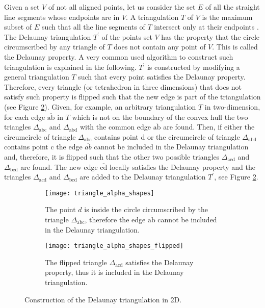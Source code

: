 Given a set $V$ of not all aligned points, let us consider the set $E$ of all the straight line segments whose endpoints are in $V$. 
A triangulation $T$ of $V$ is the maximum subset of $E$ such that all the line segments of $T$ intersect only at their endpoints \cite{lloyd1977triangulations}. \\ \indent 
The Delaunay triangulation $T^{\prime}$ of the points set $V$ has the property that the circle circumscribed by any triangle of $T$ does not contain any point of $V$. This is called the Delaunay property. A very common used algorithm to construct such triangulation is explained in the following. 
$T^\prime$ is constructed by modifying a general triangulation $T$ such that every point satisfies the Delaunay property. 
Therefore, every triangle (or tetrahedron in three dimensions) that does not satisfy such property is flipped such that the new edge is part of the triangulation (see Figure \ref{fig:Delaunay}). 
Given, for example, an arbitrary triangulation $T$ in two-dimension, for each edge $\overline{\textrm{ab}}$ in $T$ which is not on the boundary of the convex hull the two triangles 
$\Delta_{\textrm{abc}}$ and $\Delta_{\textrm{abd}}$ with the common edge $\overline{\textrm{ab}}$ are found. Then, if either the circumcircle of triangle $\Delta_{\textrm{abc}}$ contains point \textrm{d} or the circumcircle of triangle $\Delta_{\textrm{abd}}$ contains point \textrm{c} the edge $\overline{ab}$ cannot be included in the Delaunay triangulation and, therefore, it is flipped such that the other two possible triangles $\Delta_{\textrm{acd}}$ and $\Delta_{\textrm{bcd}}$ are found. The new edge $\overline{\textrm{cd}}$ locally satisfies the Delaunay property and the triangles $\Delta_{\textrm{acd}}$ and  $\Delta_{\textrm{bcd}}$ are added to the Delaunay triangulation $T^\prime$, see Figure \ref{fig:Delaunay}.  
\begin{figure}[h]\label{fig:Delaunay}
\begin{subfigure}[t]{0.48\textwidth}
\centering
\texttt{[image: triangle\_alpha\_shapes]}
\label{fig:shape}
\caption{The point $d$ is inside the circle circumscribed by the triangle $\Delta_{\textrm{abc}}$, therefore the edge $\overline{\textrm{ab}}$ cannot be included in the Delaunay triangulation.}
\end{subfigure}
\begin{subfigure}[t]{0.48\textwidth}
\centering
\texttt{[image: triangle\_alpha\_shapes\_flipped]}
\caption{The flipped triangle $\Delta_{\textrm{acd}}$ satisfies the Delaunay property, thus it is included in the Delaunay triangulation.}
\end{subfigure}
\caption{Construction of the Delaunay triangulation in 2D.}
\label{fig:Delaunay}
\end{figure}
